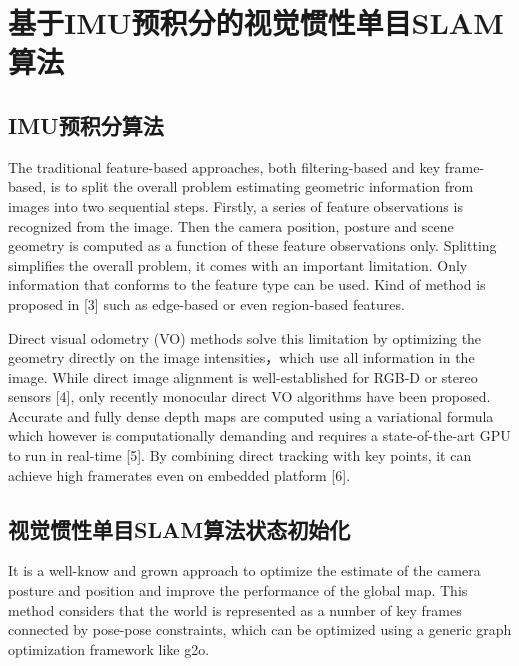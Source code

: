 
\chapter{基于IMU预积分的视觉惯性单目SLAM算法}
\label{chap:VISLAM}


\section{IMU预积分算法}
The traditional feature-based approaches, both filtering-based and key frame-based, is to split the overall problem estimating geometric information from images into two sequential steps. Firstly, a series of feature observations is recognized from the image. Then the camera position, posture and scene geometry is computed as a function of these feature observations only. Splitting simplifies the overall problem, it comes with an important limitation. Only information that conforms to the feature type can be used. Kind of method is proposed in [3] such as edge-based or even region-based features.

Direct visual odometry (VO) methods solve this limitation by optimizing the geometry directly on the image intensities，which use all information in the image. While direct image alignment is well-established for RGB-D or stereo sensors [4], only recently monocular direct VO algorithms have been proposed. Accurate and fully dense depth maps are computed using a variational formula which however is computationally demanding and requires a state-of-the-art GPU to run in real-time [5]. By combining direct tracking with key points, it can achieve high framerates even on embedded platform [6].


\section{视觉惯性单目SLAM算法状态初始化}
It is a well-know and grown approach to optimize the estimate of the camera posture and position and improve the performance of the global map. This method considers that the world is represented as a number of key frames connected by pose-pose constraints, which can be optimized using a generic graph optimization framework like g2o.


